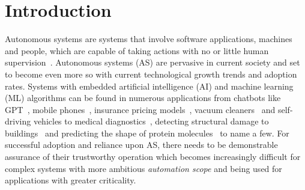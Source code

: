 % 


\section{Introduction}\label{sec:intro}

Autonomous systems are systems that involve software applications, machines and people, which are capable of taking actions with no or little human supervision~\cite{Murukannaiah2020}.
%
Autonomous systems (AS) are pervasive in current society and set to become even more so with current technological growth trends and adoption rates. Systems with embedded artificial intelligence (AI) and machine learning (ML) algorithms can be found in numerous applications from chatbots like GPT~\cite{floridi2020gpt}, mobile phones~\cite{mediumaiphones}, insurance pricing models~\cite{kuo2020towards}, vacuum cleaners~\cite{tf_vacuum} and self-driving vehicles to medical diagnostics~\cite{kononenko2001machine}, detecting structural damage to buildings~\cite{avci2021review} and predicting the shape of protein molecules~\cite{alpha_fold} to name a few.
%
For successful adoption and reliance upon AS, there needs to be demonstrable assurance of their trustworthy operation which becomes increasingly difficult for complex systems with more ambitious \emph{automation scope} and being used for applications with greater criticality. 
%

